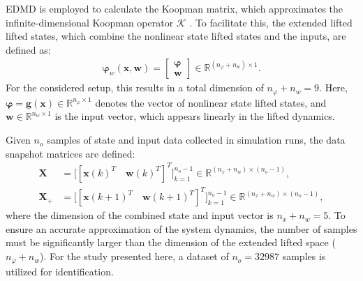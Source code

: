 EDMD is employed to calculate the Koopman matrix, which approximates the infinite-dimensional Koopman operator $\mathcal{K}$ \cite{arbabi2018data}. To facilitate this, the extended lifted lifted states, which combine the nonlinear state lifted states and the inputs, are defined as:
\begin{align}\label{eq:extLiftObs}
    \bm{\varphi}_w(\bm{x},\bm{w}) = 
    \begin{bmatrix}
      \bm{ \varphi}\\ \bm{w}
    \end{bmatrix} \in \mathbb{R}^{(n_\varphi + n_w) \times 1}.
\end{align}
For the considered setup, this results in a total dimension of $n_\varphi + n_w = 9$. Here, $\bm{\varphi} = \bm{g}(\bm{x}) \in \mathbb{R}^{n_\varphi \times 1}$ denotes the vector of nonlinear state lifted states, and $\bm{w} \in \mathbb{R}^{n_w \times 1}$ is the input vector, which appears linearly in the lifted dynamics.

Given $n_o$ samples of state and input data collected in simulation runs, the data snapshot matrices are defined:
\begin{align} \label{eq:DataCollAIC}
    \bm{X} &= \bigl[ [\bm{x}(k)^T \quad \bm{w}(k)^T]^T \bigr]_{k=1}^{n_o-1} \in \mathbb{R}^{(n_x+n_w)\times (n_o-1)}, \\
    \bm{X}_{+} &= \bigl[ [\bm{x}(k+1)^T\quad \bm{w}(k+1)^T]^T \bigr]_{k=1}^{n_o-1} \in \mathbb{R}^{(n_x+n_w)\times (n_o-1)},
\end{align}
where the dimension of the combined state and input vector is $n_x + n_w = 5$. To ensure an accurate approximation of the system dynamics, the number of samples must be significantly larger than the dimension of the extended lifted space ($n_\varphi + n_w$). For the study presented here, a dataset of $n_o = 32987$ samples is utilized for identification.


